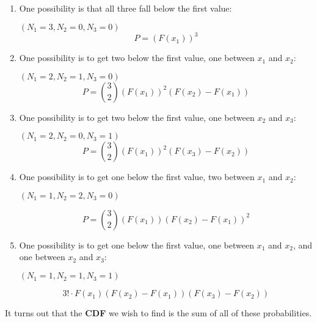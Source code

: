 \documentclass{article}
\begin{document}
    \begin{enumerate}
        \item One possibility is that all three fall below the first value: 
        
        $(N_1 = 3, N_2 = 0, N_3 = 0)$
        \begin{equation*}
            P = \left(F(x_1) \right)^3
        \end{equation*}
        
        \item One possibility is to get two below the first value, one between $x_1$ and $x_2$: 
        
        $(N_1 = 2, N_2 = 1, N_3 = 0)$
        \begin{equation*}
            P = \binom{3}{2} \left(F(x_1) \right)^2 (F(x_2)-F(x_1))
        \end{equation*}
        
        \item One possibility is to get two below the first value, one between $x_2$ and $x_3$: 
        
        $(N_1 = 2, N_2 = 0, N_3 = 1)$
        \begin{equation*}
            P = \binom{3}{2} \left(F(x_1) \right)^2 (F(x_3)-F(x_2))
        \end{equation*}
        
        \item One possibility is to get one below the first value, two between $x_1$ and $x_2$: 
        
        $(N_1 = 1, N_2 = 2, N_3 = 0)$
        
        \begin{equation*}
            P = \binom{3}{2} \left(F(x_1) \right) (F(x_2)-F(x_1))^2
        \end{equation*}
        
        \item One possibility is to get one below the first value, one between $x_1$ and $x_2$, and one between $x_2$ and $x_3$: 
        
        $(N_1 = 1, N_2 = 1, N_3 = 1)$
        
        \begin{equation*}
            3!\cdot  F(x_1) (F(x_2)-F(x_1))(F(x_3)-F(x_2))
        \end{equation*}
        
    \end{enumerate}
    
    \noindent It turns out that the \textbf{CDF} we wish to find is the sum of all of these probabilities.
\end{document}
